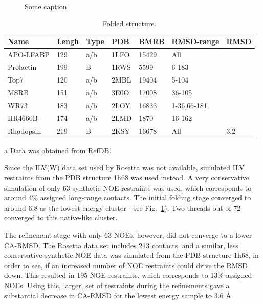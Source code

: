 \begin{figure}
{    }\\
    \caption{Some caption}
    \label{fig:rhodopsin}%
\end{figure}




\begin{table}[h]
    \caption{Folded structure.}
    \begin{center}
    \begin{threeparttable}
    \begin{tabular}{l l l l l l l}
Name                & Lengh    & Type   & PDB     & BMRB    & RMSD-range    &  RMSD  \\\hline
APO-LFABP           & 129      & a/b    & 1LFO    & 15429\tnote{a}  & All        &   \\
Prolactin           & 199      & B      & 1RWS    & 5599      & 6-183            &   \\
Top7                & 120      & a/b    & 2MBL    & 19404     & 5-104            &   \\
MSRB                & 151      & a/b    & 3E0O    & 17008     & 36-105           &   \\
WR73                & 183      & a/b    & 2LOY    & 16833     & 1-36,66-181      &   \\
HR4660B             & 174      & a/b    & 2LMD    & 1870      & 16-162           &   \\
Rhodopsin           & 219      & B      & 2KSY    & 16678     & All              & 3.2
    \end{tabular}
    \begin{tablenotes}
    \item[a] Data was obtained from RefDB.
    \end{tablenotes}
    \end{threeparttable}
    \end{center}
    \label{tab:folding_large}
\end{table}

Since the ILV(W) data set used by Rosetta was not available, simulated ILV restraints from the PDB structure 1h68 was used instead.
A very conservative simulation of only 63 synthetic NOE restraints was used, which corresponds to around 4\% assigned long-range contacts. The initial folding stage converged to around 6.8 as the lowest energy cluster - see Fig.~\ref{fig:rhodopsin}). Two threads out of 72 converged to this native-like cluster.

The refinement stage with only 63 NOEs, however, did not converge to a lower CA-RMSD.
The Rosetta data set includes 213 contacts, and a similar, less conservative synthetic NOE data was simulated from the PDB structure 1h68, in order to see, if an increased number of NOE restraints could drive the RMSD down.
 This resulted in 195 NOE restraints, which corresponds to 13\% assigned NOEs.
Using this, larger, set of restraints during the refinements gave a substantial decrease in CA-RMSD for the lowest energy sample to 3.6 \AA.

